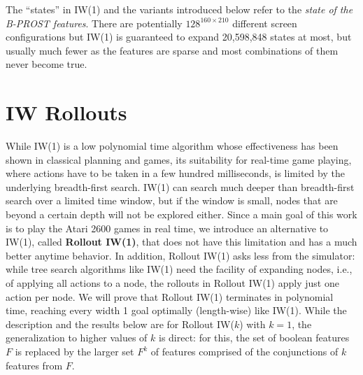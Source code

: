 \documentclass[letterpaper]{article}
\begin{document}
The ``states'' in IW(1) and the variants introduced below refer
to the \emph{state of the B-PROST features}.
There are potentially $128^{160\times210}$ different screen
configurations but IW(1) is guaranteed to expand 20,598,848
states at most, but usually much fewer as the features are
sparse and most combinations of them never become true.




\section{IW Rollouts}

While IW(1) is a low polynomial time algorithm whose effectiveness has been shown in classical planning and games,
its suitability for real-time game playing, where actions have to be taken in a few hundred milliseconds,
is limited by  the underlying breadth-first search.  IW(1) can  search much deeper than
breadth-first search over a limited time window,  but if the window is small,
nodes that are beyond a certain depth  will not be explored either.
Since a main  goal of this work is to play the Atari 2600 games in real time,
we introduce an alternative to IW(1), called \textbf{Rollout IW(1)}, that does not have this limitation and has a
much better anytime behavior.
In addition, Rollout IW(1) asks less from the simulator: while tree search algorithms like IW(1) need the facility of
expanding nodes, i.e., of applying all actions to a node, the rollouts in Rollout IW(1) apply
just one action per node.  We will prove  that Rollout IW(1) terminates
in polynomial time, reaching every  width 1 goal  optimally (length-wise) like IW(1).
While the description and the results below are for Rollout IW($k$) with $k=1$,
the generalization to higher values of $k$ is direct: for this, the set of boolean features $F$ is
replaced by the larger set $F^k$ of features comprised of  the  conjunctions  of $k$ features from $F$.
\end{document}

